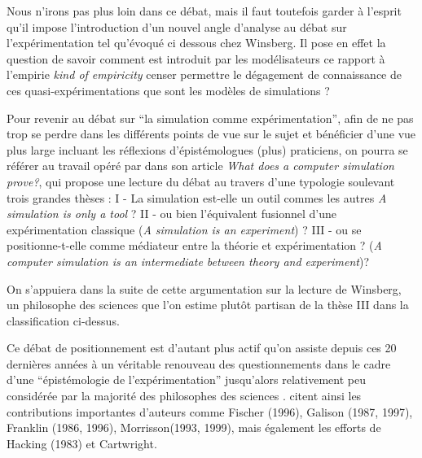 Nous n'irons pas plus loin dans ce débat, mais il faut toutefois garder à l'esprit qu'il impose l'introduction \autocite{Phan2010, Varenne2013b} d'un nouvel angle d'analyse au débat sur l'expérimentation tel qu'évoqué ci dessous chez Winsberg. Il pose en effet la question de savoir comment est introduit par les modélisateurs ce rapport à l'empirie \textit{kind of empiricity} censer permettre le dégagement de connaissance de ces quasi-expérimentations que sont les modèles de simulations \autocite{Phan2010} ?

Pour revenir au débat sur \enquote{la simulation comme expérimentation}, afin de ne pas trop se perdre dans les différents points de vue sur le sujet et bénéficier d'une vue plus large incluant les réflexions d'épistémologues (plus) praticiens, on pourra se référer au travail opéré par \textcite{Varenne2001} dans son article \textit{What does a computer simulation prove?}, qui propose une lecture du débat au travers d'une typologie soulevant trois grandes thèses : I - La simulation est-elle un outil commes les autres \textit{A simulation is only a tool} ? II - ou bien l'équivalent fusionnel d'une expérimentation classique (\textit{A simulation is an experiment}) ? III - ou se positionne-t-elle comme médiateur entre la théorie et expérimentation ? (\textit{A computer simulation is an intermediate between theory and experiment})?



On s'appuiera dans la suite de cette argumentation sur la lecture de Winsberg, un philosophe des sciences que l'on estime plutôt partisan de la thèse III dans la classification ci-dessus.

Ce débat de positionnement est d'autant plus actif qu'on assiste depuis ces 20 dernières années à un véritable renouveau des questionnements dans le cadre d'une \enquote{épistémologie de l'expérimentation} jusqu'alors relativement peu considérée par la majorité des philosophes des sciences . \textcites{Phan2008, Phan2010} citent ainsi les contributions importantes d'auteurs comme Fischer (1996), Galison (1987, 1997), Franklin (1986, 1996), Morrisson(1993, 1999), mais également les efforts de Hacking (1983) et Cartwright.


